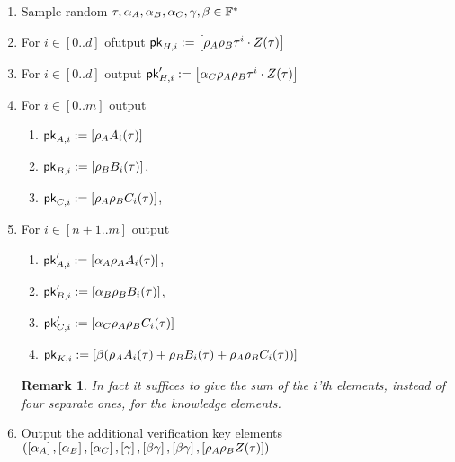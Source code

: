 \documentclass[11pt]{article}
\numberwithin{figure}{section} %
\newtheorem{remark}[thm]{Remark}
\begin{document}
\begin{enumerate}
 \item Sample random $\tau,\alpha_A,\alpha_B,\alpha_C,\gamma,\beta\in \mathbb F^*$
 \item For $i\in [0..d]$ ofutput $\mathsf{pk}_{H,i}:= \left[\rho_A\rho_B \tau^i\cdot Z(\tau)\right]$
\item For $i\in [0..d]$ output $\mathsf{pk}'_{H,i}:= \left[\alpha_C \rho_A\rho_B \tau^i\cdot Z(\tau)\right]$
 \item For $i\in [0..m]$ output
 
 \begin{enumerate}
  \item $\mathsf{pk}_{A,i}:= \left[\rho_A A_i(\tau)\right]$
  
\item $\mathsf{pk}_{B,i}:=\left[\rho_B B_i(\tau)\right]$,
\item $\mathsf{pk}_{C,i}:= \left[\rho_A\rho_B C_i(\tau)\right]$,

\end{enumerate}
 \item For $i\in [n+1..m]$ output
\begin{enumerate}
\item  $\mathsf{pk}'_{A,i}:=\left[\alpha_A\rho_A A_i(\tau)\right]$,
\item $\mathsf{pk}'_{B,i}:= \left[\alpha_B\rho_B B_i(\tau)\right]$,
\item $\mathsf{pk}'_{C,i}:= \left[\alpha_C \rho_A\rho_B C_i(\tau)\right]$
\item $\mathsf{pk}_{K,i}:= \left[\beta(\rho_A A_i(\tau) + \rho_B B_i(\tau) + \rho_A\rho_B C_i(\tau))\right]$ 


\end{enumerate}

\begin{remark}
 In fact it suffices to give the \emph{sum} of the $i$'th elements, instead of four separate ones, for the knowledge elements.
\end{remark}


\item Output the additional verification key elements $(\left[\alpha_A\right],\left[\alpha_B\right],\left[\alpha_C\right],\left[\gamma\right],\left[\beta\gamma\right],\left[\beta\gamma\right],\left[\rho_A\rho_B Z(\tau)\right])$
 \end{enumerate}
\end{document}
